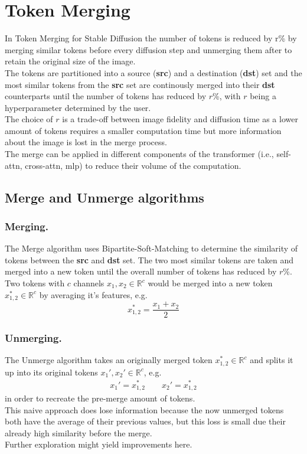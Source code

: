 \section{Token Merging}
In Token Merging for Stable Diffusion\cite{bolya2023tomesd} the number of tokens is reduced by r\% by merging similar tokens before every diffusion step and unmerging them after to retain the original size of the image.\\
The tokens are partitioned into a source (\textbf{src}) and a destination (\textbf{dst}) set and the most similar tokens from the \textbf{src} set are continously merged into their \textbf{dst} counterparts until the number of tokens has reduced by \(r\)\%, with \(r\) being a hyperparameter determined by the user.\\ 
The choice of \(r\) is a trade-off between image fidelity and diffusion time as a lower amount of tokens requires a smaller computation time but more information about the image is lost in the merge process.\\
The merge can be applied in different components of the transformer (i.e., self-attn, cross-attn, mlp) to reduce their volume of the computation. 

\subsection{Merge and Unmerge algorithms}
\subsubsection*{Merging.} The Merge algorithm uses Bipartite-Soft-Matching to determine the similarity of tokens between the \textbf{src} and \textbf{dst} set. The two most similar tokens are taken and merged into a new token until the overall number of tokens has reduced by \(r\)\%.\\
Two tokens with \(c\) channels \(x_1, x_2 \in \mathbb{R}^c\) would be merged into a new token \(x_{1,2}^* \in \mathbb{R}^c \) by averaging it's features, e.g. \[x_{1,2}^* = \frac{x_1 + x_2}{2}\]

\subsubsection*{Unmerging.} The Unmerge algorithm takes an originally merged token $x_{1,2}^* \in \mathbb{R}^c$ and splits it up into its original tokens $x_1', x_2' \in \mathbb{R}^c$, e.g. 
\begin{align*}
    x_1' = x_{1,2}^* \quad\quad
    x_2' = x_{1,2}^*
\end{align*}
in order to recreate the pre-merge amount of tokens.\\
This naive approach does lose information because the now unmerged tokens both have the average of their previous values, but this loss is small due their already high similarity before the merge.\\ Further exploration might yield improvements here.

